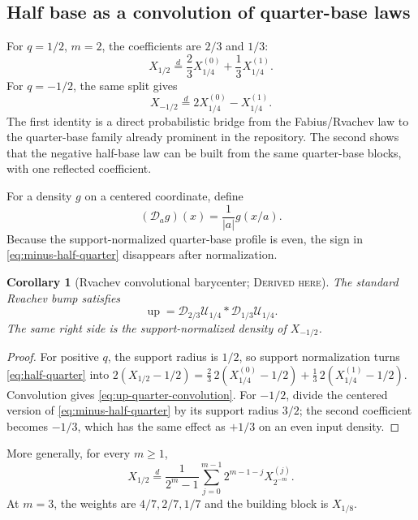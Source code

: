 \documentclass[11pt,oneside]{article}
\newtheorem{corollary}[theorem]{Corollary}
\theoremstyle{definition}
\theoremstyle{remark}
\newcommand{\Up}{\operatorname{up}}
\newcommand{\Dsc}{\mathcal D}
\newcommand{\Derived}{\textsc{Derived here}}
\begin{document}
\subsection{Half base as a convolution of quarter-base laws}
For \(q=1/2\), \(m=2\), the coefficients are \(2/3\) and \(1/3\):
\begin{equation}\label{eq:half-quarter}
 X_{1/2}\stackrel d=\frac23X_{1/4}^{(0)}+\frac13X_{1/4}^{(1)}.
\end{equation}
For \(q=-1/2\), the same split gives
\begin{equation}\label{eq:minus-half-quarter}
 X_{-1/2}\stackrel d=2X_{1/4}^{(0)}-X_{1/4}^{(1)}.
\end{equation}
The first identity is a direct probabilistic bridge from the Fabius/Rvachev
law to the quarter-base family already prominent in the repository.  The
second shows that the negative half-base law can be built from the same
quarter-base blocks, with one reflected coefficient.

For a density \(g\) on a centered coordinate, define
\[
 (\Dsc_a g)(x)=\frac1{|a|}g(x/a).
\]
Because the support-normalized quarter-base profile is even, the sign in
\eqref{eq:minus-half-quarter} disappears after normalization.

\begin{corollary}[Rvachev convolutional barycenter; \Derived]\label{cor:up-quarter}
The standard Rvachev bump satisfies
\begin{equation}\label{eq:up-quarter-convolution}
 \Up=\Dsc_{2/3}\mathcal U_{1/4}*\Dsc_{1/3}\mathcal U_{1/4}.
\end{equation}
The same right side is the support-normalized density of \(X_{-1/2}\).
\end{corollary}

\begin{proof}
For positive \(q\), the support radius is \(1/2\), so support normalization
turns \eqref{eq:half-quarter} into
\(2(X_{1/2}-1/2)=\frac23\,2(X_{1/4}^{(0)}-1/2)
+\frac13\,2(X_{1/4}^{(1)}-1/2)\).  Convolution gives
\eqref{eq:up-quarter-convolution}.  For \(-1/2\), divide the centered version
of \eqref{eq:minus-half-quarter} by its support radius \(3/2\); the second
coefficient becomes \(-1/3\), which has the same effect as \(+1/3\) on an even
input density.
\end{proof}

More generally, for every \(m\ge1\),
\begin{equation}\label{eq:half-to-2m}
 X_{1/2}\stackrel d=\frac{1}{2^m-1}\sum_{j=0}^{m-1}2^{m-1-j}
 X_{2^{-m}}^{(j)}.
\end{equation}
At \(m=3\), the weights are \(4/7,2/7,1/7\) and the building block is
\(X_{1/8}\).
\end{document}
